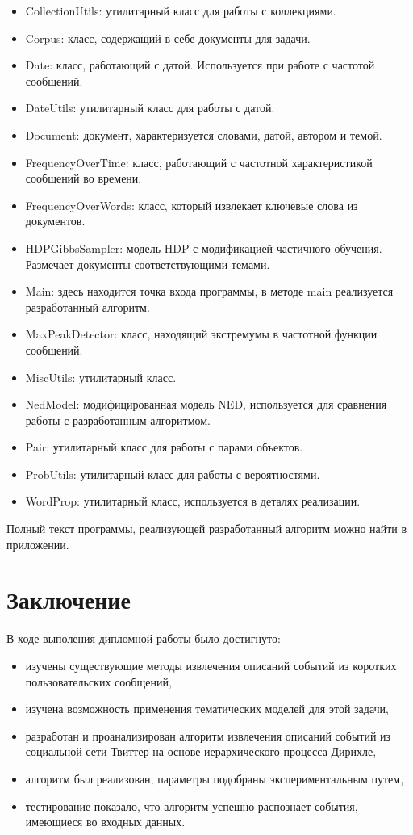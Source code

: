 \documentclass[12pt, a4paper]{article}
\begin{document}
	\begin{itemize}
\item CollectionUtils: утилитарный класс для работы с коллекциями.
\item Corpus: класс, содержащий в себе документы для задачи.
\item Date: класс, работающий с датой. Используется при работе с частотой сообщений.
\item DateUtils: утилитарный класс для работы с датой.
\item Document: документ, характеризуется словами, датой, автором и темой.
\item FrequencyOverTime: класс, работающий с частотной характеристикой сообщений во времени.
\item FrequencyOverWords: класс, который извлекает ключевые слова из документов.
\item HDPGibbsSampler: модель HDP с модификацией частичного обучения. Размечает документы соответствующими темами.
\item Main: здесь находится точка входа программы, в методе main реализуется разработанный алгоритм.
\item MaxPeakDetector: класс, находящий экстремумы в частотной функции сообщений.
\item MiscUtils: утилитарный класс.
\item NedModel: модифицированная модель NED, используется для сравнения работы с разработанным алгоритмом.
\item Pair: утилитарный класс для работы с парами объектов.
\item ProbUtils: утилитарный класс для работы с вероятностями.
\item WordProp: утилитарный класс, используется в деталях реализации.
\end{itemize}

Полный текст программы, реализующей разработанный алгоритм можно найти в приложении.
	
	
	\section*{Заключение}
	В ходе выполения дипломной работы было достигнуто:
	\begin{itemize}
	\item изучены существующие методы извлечения описаний событий из коротких пользовательских сообщений,
	\item изучена возможность применения тематических моделей для этой задачи,
	\item разработан и проанализирован алгоритм извлечения описаний событий из социальной сети Твиттер на основе иерархического процесса Дирихле,
	\item алгоритм был реализован, параметры подобраны экспериментальным путем,
	\item тестирование показало, что алгоритм успешно распознает события, имеющиеся во входных данных.
	\end{itemize}
	
\end{document}
